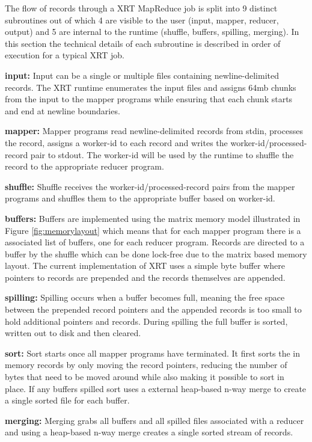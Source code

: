 \documentclass[twocolumn,11px]{article}       %
\begin{document}
The flow of records through a XRT MapReduce job is split into 9 distinct subroutines out of which 4 are visible to the user (input, mapper, reducer, output) and 5 are internal to the runtime (shuffle, buffers, spilling, merging).
In this section the technical details of each subroutine is described in order of execution for a typical XRT job.

\bigskip
\noindent
\textbf{input:} Input can be a single or multiple files containing newline-delimited records.
The XRT runtime enumerates the input files and assigns 64mb chunks from the input to the mapper programs while ensuring that each chunk starts and end at newline boundaries.

\bigskip
\noindent
\textbf{mapper:} Mapper programs read newline-delimited records from stdin, processes the record, assigns a worker-id to each record and writes the worker-id/processed-record pair to stdout.
The worker-id will be used by the runtime to shuffle the record to the appropriate reducer program.

\bigskip
\noindent
\textbf{shuffle:} Shuffle receives the worker-id/processed-record pairs from the mapper programs and shuffles them to the appropriate buffer based on worker-id.

\bigskip
\noindent
\textbf{buffers:} Buffers are implemented using the matrix memory model illustrated in Figure \ref{fig:memorylayout} which means that for each mapper program there is a associated list of buffers, one for each reducer program.
Records are directed to a buffer by the shuffle which can be done lock-free due to the matrix based memory layout.
The current implementation of XRT uses a simple byte buffer where pointers to records are prepended and the records themselves are appended.

\bigskip
\noindent
\textbf{spilling:} Spilling occurs when a buffer becomes full, meaning the free space between the prepended record pointers and the appended records is too small to hold additional pointers and records.
During spilling the full buffer is sorted, written out to disk and then cleared.

\bigskip
\noindent
\textbf{sort:} Sort starts once all mapper programs have terminated.
It first sorts the in memory records by only moving the record pointers, reducing the number of bytes that need to be moved around while also making it possible to sort in place.
If any buffers spilled sort uses a external heap-based n-way merge to create a single sorted file for each buffer.

\bigskip
\noindent
\textbf{merging:} Merging grabs all buffers and all spilled files associated with a reducer and using a heap-based n-way merge creates a single sorted stream of records.
\end{document}
